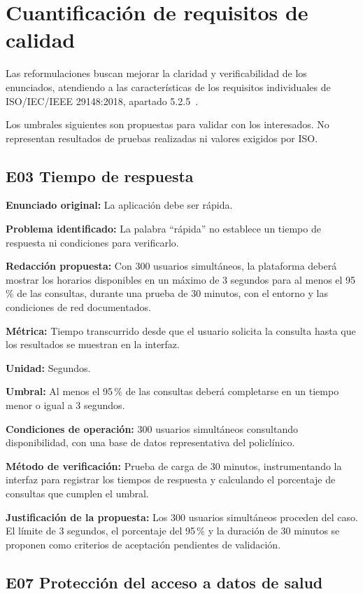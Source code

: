 \documentclass[11pt,a4paper]{article}
\begin{document}
\section{Cuantificación de requisitos de calidad}

Las reformulaciones buscan mejorar la claridad
y verificabilidad de los enunciados, atendiendo
a las características de los requisitos individuales
de ISO/IEC/IEEE 29148:2018,
apartado 5.2.5~\cite{iso29148}.

Los umbrales siguientes son propuestas para validar
con los interesados. No representan resultados de
pruebas realizadas ni valores exigidos por ISO.

\subsection{E03 Tiempo de respuesta}

\textbf{Enunciado original:}
La aplicación debe ser rápida.

\textbf{Problema identificado:}
La palabra ``rápida'' no establece un tiempo
de respuesta ni condiciones para verificarlo.

\textbf{Redacción propuesta:}
Con 300 usuarios simultáneos, la plataforma deberá
mostrar los horarios disponibles en un máximo
de 3 segundos para al menos el 95\,\% de las
consultas, durante una prueba de 30 minutos,
con el entorno y las condiciones de red documentados.

\textbf{Métrica:}
Tiempo transcurrido desde que el usuario solicita
la consulta hasta que los resultados se muestran
en la interfaz.

\textbf{Unidad:} Segundos.

\textbf{Umbral:}
Al menos el 95\,\% de las consultas deberá
completarse en un tiempo menor o igual a 3 segundos.

\textbf{Condiciones de operación:}
300 usuarios simultáneos consultando disponibilidad,
con una base de datos representativa del policlínico.

\textbf{Método de verificación:}
Prueba de carga de 30 minutos, instrumentando
la interfaz para registrar los tiempos de respuesta
y calculando el porcentaje de consultas que
cumplen el umbral.

\textbf{Justificación de la propuesta:}
Los 300 usuarios simultáneos proceden del caso.
El límite de 3 segundos, el porcentaje del 95\,\%
y la duración de 30 minutos se proponen como
criterios de aceptación pendientes de validación.

\subsection{E07 Protección del acceso a datos de salud}
\end{document}
